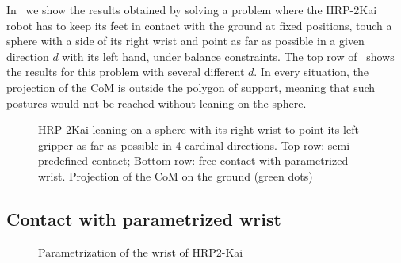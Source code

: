 In~ we show the results obtained by solving a problem where the HRP-2Kai robot has to keep its feet in contact with the ground at fixed positions, touch a sphere with a side of its right wrist and point as far as possible in a given direction $d$ with its left hand, under balance constraints.
The top row of~ shows the results for this problem with several different $d$.
In every situation, the projection of the CoM is outside the polygon of support, meaning that such postures would not be reached without leaning on the sphere.
\begin{figure}
\centering
  \centering
  \setlength\fboxsep{0pt}
  \setlength\fboxrule{1pt}
  \caption{HRP-2Kai leaning on a sphere with its right wrist to point its left gripper as far as possible in 4 cardinal directions.
  Top row: semi-predefined contact; Bottom row: free contact with parametrized wrist.
  Projection of the CoM on the ground (green dots)}
\label{fig:contact_plan_sphere}
\end{figure}

\subsection{Contact with parametrized wrist}

\begin{figure}[!htb]
\centering
  \centering
  \setlength\fboxsep{0pt}
  \setlength\fboxrule{1pt}
\caption{Parametrization of the wrist of HRP2-Kai}
\label{fig:param_wrist_detail}
\end{figure}


